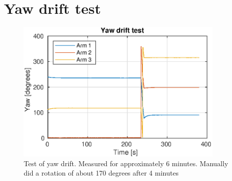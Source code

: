 \chapter{Yaw drift test}
\begin{figure}[h]
    \centering
    \includegraphics[width=0.9\textwidth]{figures/results/Yaw_drifttest.eps}
    \caption{Test of yaw drift. Measured for approximately 6 minutes. Manually did a rotation of about 170 degrees after 4 minutes}
    \label{fig:yawdrifttest}
\end{figure}